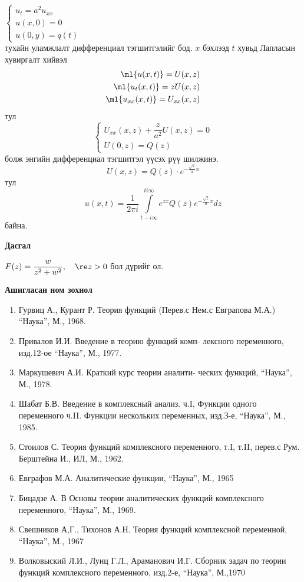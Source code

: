 \begin{exm}
$\begin{cases}
 u_t=a^2u_{xx}\\
 u(x,0)=0\\
 u(0,y)=q(t)
\end{cases} 
$ \\
тухайн уламжлалт дифференциал тэгшитгэлийг бод. $x$ бэхлээд $t$ хувьд Лапласын хувиргалт хийвэл
\begin{align*}
    \ml{u(x,t)}=U(x,z)\\
    \ml{u_t(x,t)}=zU(x,z)\\
    \ml{u_{xx}(x,t)}=U_{xx}(x,z)
\end{align*} тул 
$$\begin{cases}
 U_{xx}(x,z)+\dfrac{z}{a^2}U(x,z)=0\\
 U(0,z)=Q(z)
\end{cases}
$$ болж энгийн дифференциал тэгшитгэл үүсэх рүү шилжинэ.
$$U(x,z)=Q(z)\cdot e^{-\frac{\sqrt{z}}{a}x}$$ тул 
$$u(x,t)=\frac{1}{2\pi i}\int\limits_{t-i\infty}^{ti\infty} e^{zx}Q(z)e^{-\frac{\sqrt{z}}{a}x}dz$$ байна.
\end{exm}
\begin{center}
    \textbf{Дасгал}
\end{center}
$F(z)=\dfrac{w}{z^2+w^2}, \quad \re z>0$ бол дүрийг ол. 
\\
\newpage
\begin{center}
    \textbf{Ашигласан ном зохиол}
\end{center}
\begin{enumerate}
    \item Гурвиц А., Курант Р. Теория функций (Перев.с Нем.с Евграпова М.А.) “Наука”, М., 1968.
    \item Привалов И.И. Введение в теорию функций комп- лексного переменного, изд.12-ое “Наука”, М., 1977.
    \item Маркушевич А.И. Краткий курс теории аналити- ческих функций, “Наука”, М., 1978.
    \item Шабат Б.В. Введение в комплексный анализ. ч.I, Функции одного переменного ч.II. Функции нескольких переменных, изд.З-е, “Наука”, М., 1985.
    \item Стоилов С. Теория функций комплексного переменного, т.I, т.II, перев.с Рум. Берштейна И., ИЛ, М., 1962.
    \item Евграфов М.А. Аналитические функции, “Наука”, М., 1965
    \item Бицадзе А. В Основы теории аналитических функций комплексного переменного, “Наука”, М., 1969.
    \item Свешников А,Г., Тихонов А.Н. Теория функций комплексной переменной, “Наука”, М., 1967
    \item Волковыский Л.И., Лунц Г.Л., Араманович И.Г. Сборник задач по теории функций комплексного переменного, изд.2-е, “Наука”, М.,1970
\end{enumerate}